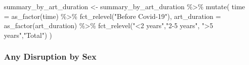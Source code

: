 \documentclass[
  letterpaper,
  DIV=11,
  numbers=noendperiod]{scrartcl}
\newenvironment{Shaded}{\begin{snugshade}}{\end{snugshade}}
\newcommand{\AttributeTok}[1]{\textcolor[rgb]{0.40,0.45,0.13}{#1}}
\newcommand{\FunctionTok}[1]{\textcolor[rgb]{0.28,0.35,0.67}{#1}}
\newcommand{\NormalTok}[1]{\textcolor[rgb]{0.00,0.23,0.31}{#1}}
\newcommand{\OtherTok}[1]{\textcolor[rgb]{0.00,0.23,0.31}{#1}}
\newcommand{\SpecialCharTok}[1]{\textcolor[rgb]{0.37,0.37,0.37}{#1}}
\newcommand{\StringTok}[1]{\textcolor[rgb]{0.13,0.47,0.30}{#1}}
\begin{document}
\begin{Shaded}
\begin{Highlighting}[]
\NormalTok{summary\_by\_art\_duration }\OtherTok{\textless{}{-}}\NormalTok{  summary\_by\_art\_duration }\SpecialCharTok{\%\textgreater{}\%} 
  \FunctionTok{mutate}\NormalTok{(}
    \AttributeTok{time =} \FunctionTok{as\_factor}\NormalTok{(time) }\SpecialCharTok{\%\textgreater{}\%} 
           \FunctionTok{fct\_relevel}\NormalTok{(}\StringTok{"Before Covid{-}19"}\NormalTok{),}
    \AttributeTok{art\_duration =} \FunctionTok{as\_factor}\NormalTok{(art\_duration) }\SpecialCharTok{\%\textgreater{}\%} 
      \FunctionTok{fct\_relevel}\NormalTok{(}\StringTok{"\textless{}2 years"}\NormalTok{,}\StringTok{"2{-}5 years"}\NormalTok{, }\StringTok{"\textgreater{}5 years"}\NormalTok{,}\StringTok{"Total"}\NormalTok{)}
\NormalTok{  )}
\end{Highlighting}
\end{Shaded}

\subsubsection{Any Disruption by Sex}\label{any-disruption-by-sex}
\end{document}
